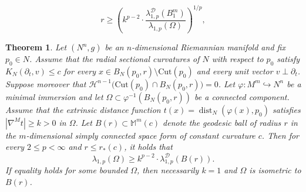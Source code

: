 \documentclass[10pt,a4paper]{amsart}
\newtheorem{theorem}{Theorem}
\begin{document}
\begin{equation}\label{lowerradiostone}
r \geq \left( k^{p-2} \cdot \frac{\lambda_{1,p}^{\mathcal D}(B_1^m)}{\lambda_{1,p}(\Omega)}\right)^{1/p},
\end{equation}

\begin{theorem}\label{thm:pminsub_ball}
Let $(N^n,g)$ be an $n$-dimensional Riemannian manifold and fix $p_0\in N$. Assume that the radial sectional curvatures of $N$ with respect to $p_0$ satisfy $K_N(\partial_t,v) \leq c$ for every $x\in B_N(p_0,r)\setminus \mathrm{Cut}(p_0)$ and every unit vector 
$v\perp \partial_t$. Suppose moreover that $\mathcal{H}^{n-1}\!\big(\mathrm{Cut}(p_0)\cap B_N(p_0,r)\big)=0$. Let $\varphi:M^m\hookrightarrow N^n$ be a minimal immersion and let 
$\Omega\subset \varphi^{-1}(B_N(p_0,r))$ be a connected component. 
Assume that the extrinsic distance function $t(x)=\operatorname{dist}_N(\varphi(x),p_0)$ satisfies $|\nabla^M t|\ge k>0$ in $\Omega$. Let $B(r)\subset \mathbb{M}^m(c)$ denote the geodesic ball of radius $r$ in the 
$m$-dimensional simply connected space form of constant curvature $c$. 
Then for every $2\le p<\infty$ and $r\le r_\ast(c)$, it holds that
\[
\lambda_{1,p}(\Omega)
\ge
k^{p-2} \cdot \lambda_{1,p}^{\mathcal D}(B(r)).
\]
If equality holds for some bounded $\Omega$, then necessarily 
$k=1$ and $\Omega$ is isometric to $B(r)$.
\end{theorem}
\end{document}
